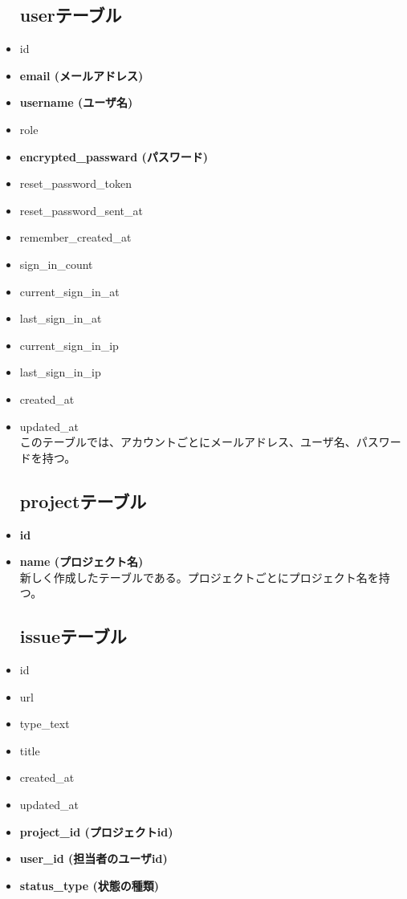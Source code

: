 \documentclass[12pt, oneside]{jreport}
\begin{document}
	\begin{itemize}
	
		\subsection{userテーブル}
		\item id
		\item {\bf email (メールアドレス)}
		\item {\bf username (ユーザ名)}
		\item role
		\item {\bf encrypted\_passward (パスワード)}
		\item reset\_password\_token
		\item reset\_password\_sent\_at 
		\item remember\_created\_at
		\item sign\_in\_count
		\item current\_sign\_in\_at
		\item last\_sign\_in\_at
		\item current\_sign\_in\_ip
		\item last\_sign\_in\_ip
		\item created\_at
		\item updated\_at \\
		
		このテーブルでは、アカウントごとにメールアドレス、ユーザ名、パスワードを持つ。
		
		\subsection{projectテーブル}
		\item {\bf id}
		\item {\bf name (プロジェクト名)} \\

		新しく作成したテーブルである。プロジェクトごとにプロジェクト名を持つ。
		
		\subsection{issueテーブル}
		\item id
		\item url
		\item type\_text
		\item title 
		\item created\_at
		\item updated\_at
		\item {\bf project\_id (プロジェクトid)}
		\item {\bf user\_id (担当者のユーザid)}
		\item {\bf status\_type (状態の種類)} \\
		

\end{itemize}
\end{document}

